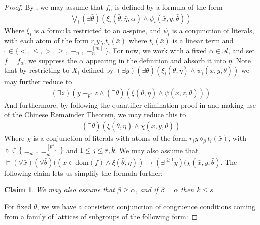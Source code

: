 \documentclass[a4paper,11pt]{article}
\newtheorem*{claim}{Claim}
\newenvironment{claimproof}{\renewcommand{\qedsymbol}{$\blacksquare$}\proof} {\endproof} %
\newcommand{\nl}{\newline}
\newcommand{\tx}{\textrm}
\begin{document}
\begin{proof}
	By \cite{QE}, we may assume that $f_\alpha$ is defined by a formula of the form
	\begin{align*}
		\bigvee\limits_{i}(\exists\bar\theta)(\xi_i(\bar\theta, \bar\eta,\alpha)\wedge \psi_i(\bar x, y, \bar\theta))
	\end{align*}
	Where $\xi_i$ is a formula restricted to an $n$-spine, and $\psi_i$ is a conjunction of literals, with each atom of the form $r_iy\square_\alpha t_i(\bar x)$ where $t_i(\bar x)$ is a linear term and $\square \in \{<, \leq, >, \geq, \equiv_n, \equiv_n^{[m]}\}$.
    For now, we work with a fixed $\alpha\in\mathcal{A}$, and set $f = f_\alpha$; we suppress the $\alpha$ appearing in the definition and absorb it into $\bar\eta$.
	\nl\nl
	Note that by restricting to $X_i$ defined by $(\exists y)(\exists\bar\theta)(\xi_i(\bar\theta, \bar\eta)\wedge \psi_i(\bar x, y, \bar\theta))$ we may further reduce to
	\begin{align*}
		(\exists z)(y\equiv_{p^r}z\wedge(\exists\bar\theta)(\xi(\bar\theta, \bar\eta)\wedge \psi(\bar x, z, \bar\theta)))
	\end{align*}
	And furthermore, by following the quantifier-elimination proof in \cite{QE} and making use of the Chinese Remainder Theorem, we may reduce this to 
	\begin{align*}
		(\exists\bar\theta)(\xi(\bar\theta, \bar\eta)\wedge \chi(\bar x, y, \bar\theta))
	\end{align*}
	Where $\chi$ is a conjunction of literals with atoms of the form $r_iy\diamond_\beta t_i(\bar x)$, with $\diamond \in \{\equiv_{p^j}, \equiv_{p^j}^{[p^k]}\}$ and $1\leq j\leq r,k$. We may also assume that $\models (\forall \bar x)(\forall\bar\theta)((x\in\tx{dom}(f)\wedge\xi(\bar\theta,\eta))\rightarrow(\exists^{\geq 1}y)(\chi(\bar x, y,\bar\theta)$.
    \nl\nl
    The following claim lets us simplify the formula further:
    \begin{claim}
        We may also assume that $\beta \geq \alpha$, and if $\beta = \alpha$ then $k\leq s$
    \end{claim}
    \begin{claimproof}
        For fixed $\bar\theta$, we we have a consistent conjunction of congruence conditions coming from a family of lattices of subgroups of the following form:


\end{claimproof}
\end{proof}
\end{document}
